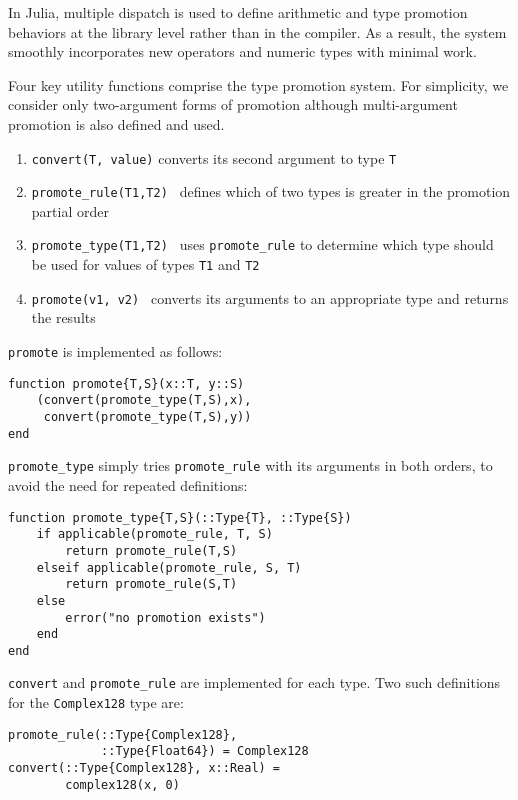\documentclass[9pt]{sigplanconf}
\begin{document}
In Julia, multiple dispatch is used to define arithmetic and type
promotion behaviors at the library level rather than in the compiler.
As a result, the system smoothly incorporates new
operators and numeric types with minimal work.

Four key utility functions comprise the type promotion system.
For simplicity, we consider only two-argument forms of promotion
although multi-argument promotion is also defined and used.

\begin{enumerate}
\item {\tt convert(T, value)} converts its second argument to type {\tt T}
\item {\tt promote\_rule(T1,T2) } defines which of two types is greater in
the promotion partial order
\item {\tt promote\_type(T1,T2) } uses {\tt promote\_rule} to determine which
type should be used for values of types {\tt T1} and {\tt T2}
\item {\tt promote(v1, v2) } converts its arguments to an appropriate type
and returns the results
\end{enumerate}

{\tt promote} is implemented as follows:

\begin{verbatim}
function promote{T,S}(x::T, y::S)
    (convert(promote_type(T,S),x),
     convert(promote_type(T,S),y))
end
\end{verbatim}

{\tt promote\_type} simply tries {\tt promote\_rule} with its arguments in
both orders, to avoid the need for repeated definitions:

\begin{verbatim}
function promote_type{T,S}(::Type{T}, ::Type{S})
    if applicable(promote_rule, T, S)
        return promote_rule(T,S)
    elseif applicable(promote_rule, S, T)
        return promote_rule(S,T)
    else
        error("no promotion exists")
    end
end
\end{verbatim}

{\tt convert} and {\tt promote\_rule} are implemented for each type. Two
such definitions for the {\tt Complex128} type are:

\begin{verbatim}
promote_rule(::Type{Complex128},
             ::Type{Float64}) = Complex128
convert(::Type{Complex128}, x::Real) =
        complex128(x, 0)
\end{verbatim}
\end{document}
